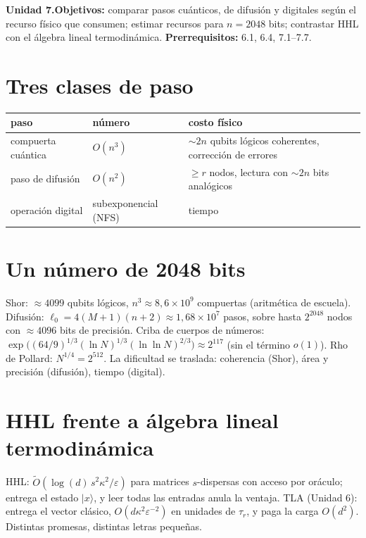 \documentclass[11pt,a4paper]{article}
\begin{document}

\noindent\textbf{Unidad 7.}\quad\textbf{Objetivos:} comparar pasos cuánticos, de difusión y digitales según el recurso físico que consumen; estimar recursos para
$n=2048$ bits; contrastar HHL con el álgebra lineal termodinámica.
\textbf{Prerrequisitos:} 6.1, 6.4, 7.1--7.7.

\section{Tres clases de paso}
\begin{center}\begin{tabular}{lll}\toprule
paso & número & costo físico\\\midrule
compuerta cuántica & $O(n^3)$ & $\sim2n$ qubits lógicos coherentes, corrección de errores\\
paso de difusión & $O(n^2)$ & $\ge r$ nodos, lectura con $\sim2n$ bits analógicos\\
operación digital & subexponencial (NFS) & tiempo\\\bottomrule\end{tabular}\end{center}

\section{Un número de 2048 bits \evE}
Shor: $\approx4099$ qubits lógicos, $n^3\approx8{,}6\times10^9$ compuertas (aritmética de escuela). Difusión: $\ell_0=4(M+1)(n+2)\approx1{,}68\times10^7$ pasos, sobre hasta
$2^{2048}$ nodos con $\approx4096$ bits de precisión. Criba de cuerpos de números: $\exp\big((64/9)^{1/3}(\ln N)^{1/3}(\ln\ln N)^{2/3}\big)\approx2^{117}$ (sin el
término $o(1)$). Rho de Pollard: $N^{1/4}=2^{512}$. La dificultad se traslada: coherencia (Shor), área y precisión (difusión), tiempo (digital).

\section{HHL frente a álgebra lineal termodinámica}
HHL: $\tilde O(\log(d)\,s^2\kappa^2/\varepsilon)$ para matrices $s$-dispersas con acceso por oráculo; entrega el estado $|x\rangle$, y leer todas las entradas
anula la ventaja. TLA (Unidad 6): entrega el vector clásico, $O(d\kappa^2\varepsilon^{-2})$ en unidades de $\tau_r$, y paga la carga $O(d^2)$. Distintas promesas,
distintas letras pequeñas.
\end{document}
